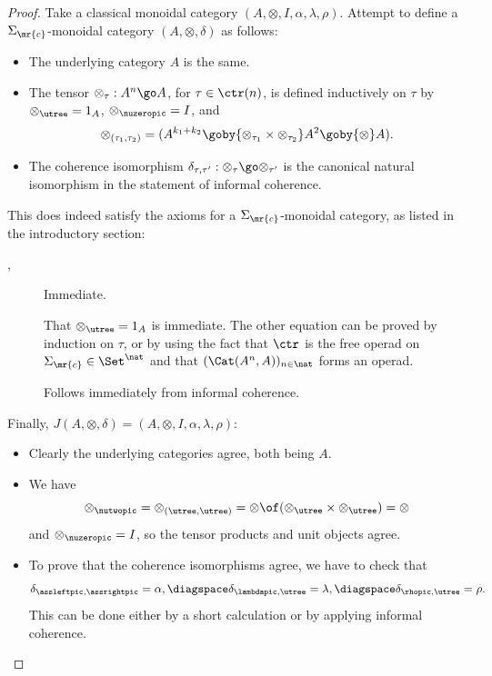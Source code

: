 \begin{proof}
Take a classical monoidal category $(A,\otimes,I,\alpha,\lambda,\rho)$.
Attempt to define a $\Sigma_\mr{c}$-monoidal category $(A,\otimes,\delta)$
as follows:
%
\begin{itemize}
\item The underlying category $A$ is the same.
\item The tensor $\otimes_\tau: A^n \go A$, for $\tau\in\ctr(n)$, is
defined inductively on $\tau$ by $\otimes_\utree = 1_A$,
$\otimes_\nuzeropic = I$, and
\[
\otimes_{(\tau_1, \tau_2)} = 
(A^{k_1 + k_2} \goby{\otimes_{\tau_1} \times \otimes_{\tau_2}}
A^2 \goby{\otimes} A).
\]
\item The coherence isomorphism $\delta_{\tau,\tau'}: \otimes_\tau \go
\otimes_{\tau'}$ is the canonical natural isomorphism in the statement of
informal coherence. 
\end{itemize}
%
This does indeed satisfy the axioms for a $\Sigma_\mr{c}$-monoidal
category, as listed in the introductory section:
%
\begin{description}
\item[, ] Immediate.
\item[] That $\otimes_\utree = 1_A$ is immediate.  The other
equation can be proved by induction on $\tau$, or by using the fact that
$\ctr$ is the free operad on $\Sigma_\mr{c} \in\Set^\nat$ and that
$(\Cat(A^n,A))_{n\in\nat}$ forms an operad.
\item[] Follows immediately from informal coherence.  
\end{description}
%
Finally, $J(A,\otimes,\delta) = (A, \otimes, I, \alpha, \lambda, \rho)$:
%
\begin{itemize}
\item Clearly the underlying categories agree, both being $A$.
\item We have 
\[
\otimes_\nutwopic = \otimes_{(\utree, \utree)}
= \otimes \of (\otimes_\utree \times \otimes_\utree)
= \otimes
\]
and $\otimes_\nuzeropic = I$, so the tensor products and unit objects
agree.
\item To prove that the coherence isomorphisms agree, we have to check that
\[
\delta_{\assleftpic, \assrightpic} = \alpha,
\diagspace
\delta_{\lambdapic, \utree} = \lambda,
\diagspace
\delta_{\rhopic, \utree} = \rho.
\]
This can be done either by a short calculation or by applying informal
coherence. 
\done
\end{itemize}
\end{proof}

